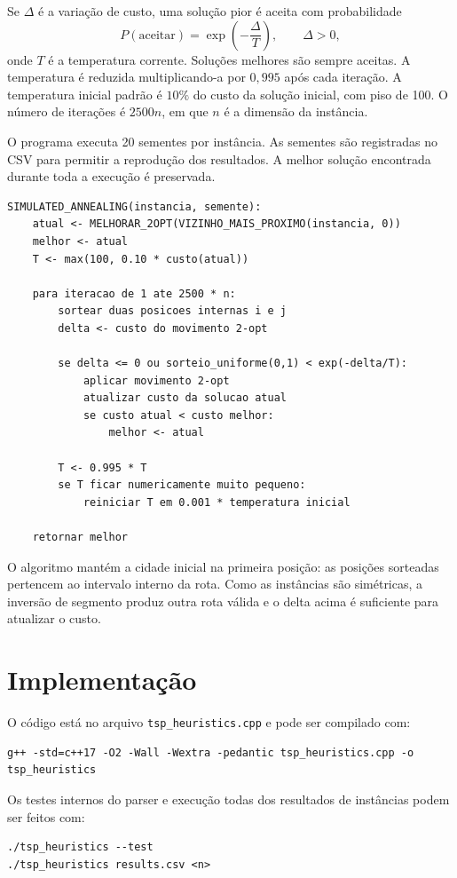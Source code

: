 \documentclass[12pt,a4paper]{article}
\begin{document}
Se $\Delta$ é a variação de custo, uma solução pior é aceita com probabilidade
\[
 P(\text{aceitar})=\exp\left(-\frac{\Delta}{T}\right), \qquad \Delta>0,
\]
onde $T$ é a temperatura corrente. Soluções melhores são sempre aceitas. A temperatura é reduzida multiplicando-a por $0{,}995$ após cada iteração. A temperatura inicial padrão é $10\%$ do custo da solução inicial, com piso de 100. O número de iterações é $2500n$, em que $n$ é a dimensão da instância.

O programa executa 20 sementes por instância. As sementes são registradas no CSV para permitir a reprodução dos resultados. A melhor solução encontrada durante toda a execução é preservada.

\begin{Verbatim}[fontsize=\small]
SIMULATED_ANNEALING(instancia, semente):
	atual <- MELHORAR_2OPT(VIZINHO_MAIS_PROXIMO(instancia, 0))
	melhor <- atual
	T <- max(100, 0.10 * custo(atual))

	para iteracao de 1 ate 2500 * n:
		sortear duas posicoes internas i e j
		delta <- custo do movimento 2-opt

		se delta <= 0 ou sorteio_uniforme(0,1) < exp(-delta/T):
			aplicar movimento 2-opt
			atualizar custo da solucao atual
			se custo atual < custo melhor:
				melhor <- atual

		T <- 0.995 * T
		se T ficar numericamente muito pequeno:
			reiniciar T em 0.001 * temperatura inicial

	retornar melhor
\end{Verbatim}

O algoritmo mantém a cidade inicial na primeira posição: as posições sorteadas pertencem ao intervalo interno da rota. Como as instâncias são simétricas, a inversão de segmento produz outra rota válida e o delta acima é suficiente para atualizar o custo.

\section{Implementação}
O código está no arquivo \texttt{tsp\_heuristics.cpp} e pode ser compilado com:

\begin{Verbatim}
g++ -std=c++17 -O2 -Wall -Wextra -pedantic tsp_heuristics.cpp -o tsp_heuristics
\end{Verbatim}

Os testes internos do parser e execução todas dos resultados de instâncias podem ser feitos com:

\begin{Verbatim}
./tsp_heuristics --test
./tsp_heuristics results.csv <n>
\end{Verbatim}
\end{document}
